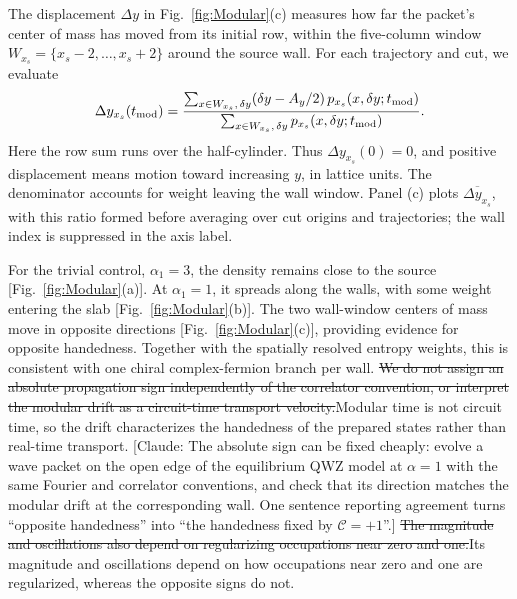 \documentclass[aps,prb,10pt,twocolumn,superscriptaddress,longbibliography,floatfix]{revtex4-2}
\newcommand{\mc}[1]{\mathcal{#1}}
\newcommand{\claudeadd}[1]{{\color{orange}#1}}
\newcommand{\claudecom}[1]{{\color{ForestGreen}[Claude: #1]}}
\newcommand{\claudedel}[1]{{\color{orange}\sout{#1}}}
\begin{document}
{The displacement $\Delta y$ in Fig.~\ref{fig:Modular}(c) measures how far the packet's center of mass has moved from its initial row, within the five-column window $W_{x_s}=\{x_s-2,\ldots,x_s+2\}$ around the source wall. For each trajectory and cut, we evaluate
\begin{equation}
 \Delta y_{x_s}(t_{\rm mod})=
 \frac{\sum_{x\in W_{x_s},\,\delta y}(\delta y-A_y/2)\,p_{x_s}(x,\delta y;t_{\rm mod})}
 {\sum_{x\in W_{x_s},\,\delta y}p_{x_s}(x,\delta y;t_{\rm mod})}.
 \label{eq:ModularDisplacement}
\end{equation}
Here the row sum runs over the half-cylinder. Thus $\Delta y_{x_s}(0)=0$, and positive displacement means motion toward increasing $y$, in lattice units. The denominator accounts for weight leaving the wall window. Panel (c) plots $\overline{\Delta y_{x_s}}$, with this ratio formed before averaging over cut origins and trajectories; the wall index is suppressed in the axis label.

For the trivial control, $\alpha_1=3$, the density remains close to the source [Fig.~\ref{fig:Modular}(a)]. At $\alpha_1=1$, it spreads along the walls, with some weight entering the slab [Fig.~\ref{fig:Modular}(b)]. The two wall-window centers of mass move in opposite directions [Fig.~\ref{fig:Modular}(c)], providing evidence for opposite handedness. Together with the spatially resolved entropy weights, this is consistent with one chiral complex-fermion branch per wall. \claudedel{We do not assign an absolute propagation sign independently of the correlator convention, or interpret the modular drift as a circuit-time transport velocity.}\claudeadd{Modular time is not circuit time, so the drift characterizes the handedness of the prepared states rather than real-time transport.} \claudecom{The absolute sign can be fixed cheaply: evolve a wave packet on the open edge of the equilibrium QWZ model at $\alpha=1$ with the same Fourier and correlator conventions, and check that its direction matches the modular drift at the corresponding wall. One sentence reporting agreement turns ``opposite handedness'' into ``the handedness fixed by $\mc C=+1$''.} \claudedel{The magnitude and oscillations also depend on regularizing occupations near zero and one.}\claudeadd{Its magnitude and oscillations depend on how occupations near zero and one are regularized, whereas the opposite signs do not.}
}
\end{document}
